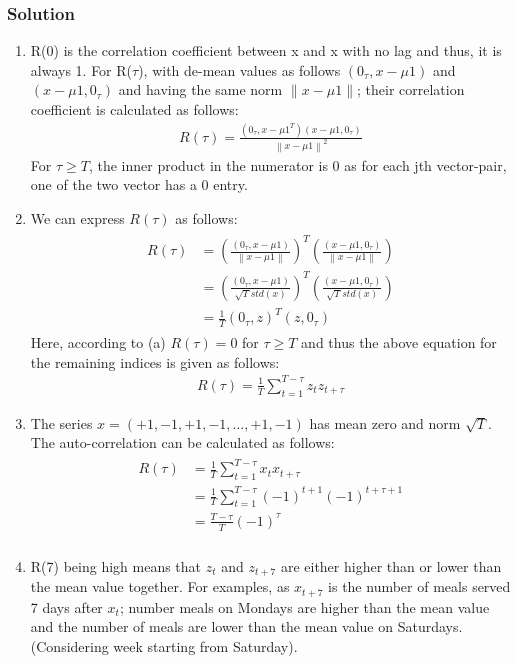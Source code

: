 \documentclass{article}
\newcommand{\norm}[1]{\left\lVert#1\right\rVert}
\begin{document}
\subsubsection*{Solution}
\begin{enumerate}[label=(\alph*)]
\item R(0) is the correlation coefficient between x and x with no lag and thus, it is always 1. For R($\tau$), with de-mean values as follows $(0_\tau,x-\mu1)$ and $(x-\mu1,0_\tau)$ and having the same norm $\norm{x-\mu1}$; their correlation coefficient is calculated as follows:
\begin{align*}
    R(\tau) = \frac{(0_\tau,x-\mu1^T)(x-\mu1,0_\tau)}{\norm{x-\mu1}^2}
\end{align*}
For $\tau \geq T$, the inner product in the numerator is 0 as for each jth vector-pair, one of the two vector has a 0 entry.
\item We can express $R(\tau)$ as follows:
\begin{align*}
\begin{split}
 R(\tau) & = \left(\frac{(0_\tau,x-\mu1)}{\norm{x-\mu1}}\right)^T\left(\frac{(x-\mu1,0_\tau)}{\norm{x-\mu1}}\right)\\
 & = \left(\frac{(0_\tau,x-\mu1)}{\sqrt{T}std(x)}\right)^T\left(\frac{(x-\mu1,0_\tau)}{\sqrt{T}std(x)}\right)\\
 & = \frac{1}{T} (0_\tau,z)^T(z,0_\tau)
\end{split}
\end{align*}
Here, according to (a) $R(\tau)=0$ for $\tau \geq T$ and thus the above equation for the remaining indices is given as follows:
\begin{align*}
    R(\tau) = \frac{1}{T}\sum\limits_{t=1}^{T-\tau}z_tz_{t+\tau}
\end{align*}
\item The series $x = (+1,-1,+1,-1,\ldots,+1,-1)$ has mean zero and norm $\sqrt{T}$. The auto-correlation can be calculated as follows:
\begin{align*}
    \begin{split}
        R(\tau) & = \frac{1}{T}\sum\limits_{t=1}^{T-\tau}x_tx_{t+\tau}\\
        & = \frac{1}{T}\sum\limits_{t=1}^{T-\tau}(-1)^{t+1}(-1)^{t+\tau+1}\\
        & = \frac{T-\tau}{T}(-1)^{\tau}\\
    \end{split}
\end{align*}
\item R(7) being high means that $z_t$ and $z_{t+7}$ are either higher than or lower than the mean value together. For examples, as $x_{t+7}$ is the number of meals served 7 days after $x_{t}$; number meals on Mondays are higher than the mean value and the number of meals are lower than the mean value on Saturdays. (Considering week starting from Saturday).  
\end{enumerate}
\end{document}
